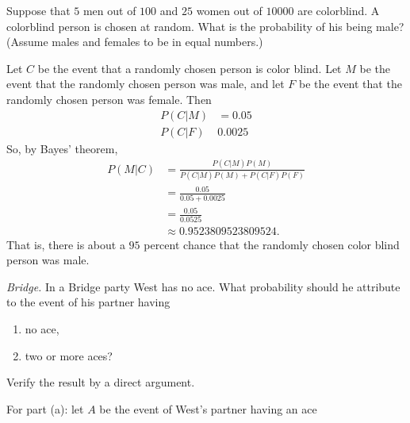\begin{problem}[Handout 4, \# 9]
  Suppose that \(5\) men out of \(100\) and \(25\) women out of
  \(\num{10000}\) are colorblind. A colorblind person is chosen at
  random. What is the probability of his being male? (Assume males and
  females to be in equal numbers.)
\end{problem}
\begin{solution}
  Let $C$ be the event that a randomly chosen person is
  color blind. Let $M$ be the event that the randomly chosen person was
  male, and let $F$ be the event that the randomly chosen person was
  female. Then
  \begin{align*}
    P(C|M)&=0.05\\
    P(C|F)& 0.0025
  \end{align*}
  So, by Bayes' theorem,
  \begin{align*}
    P(M|C)
    &=\frac{P(C|M)P(M)}{P(C|M)P(M)+P(C|F)P(F)}\\
    &=\frac{0.05}{0.05+0.0025}\\
    &=\frac{0.05}{0.0525}\\
    &\approx\num{0.9523809523809524}.
  \end{align*}
  That is, there is about a \(95\) percent chance that the randomly chosen
  color blind person was male.
\end{solution}
\newpage

\begin{problem}[Handout 4, \# 10]
  \emph{Bridge.} In a Bridge party West has no ace. What probability should
  he attribute to the event of his partner having
  \begin{enumerate}[label=(\alph*),noitemsep]
  \item no ace,
  \item two or more aces?
  \end{enumerate}
  Verify the result by a direct argument.
\end{problem}
\begin{solution}
  For part (a): let \(A\) be the event of West's partner having an ace
\end{solution}
\newpage

